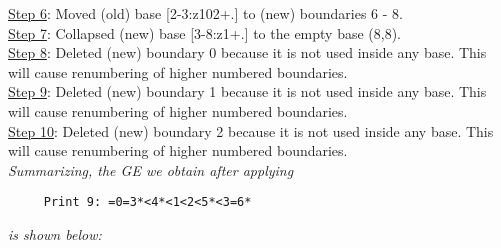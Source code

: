 \documentclass[final]{article}
\begin{document}
{\underline{Step 6}:} Moved (old) base [2-3:z102+.]  to (new) boundaries 6 - 8.\\
{\underline{Step 7}:} Collapsed (new) base [3-8:z1+.]  to the empty base (8,8).
\\
{\underline{Step 8}:} Deleted (new) boundary 0 because it is not used inside any base.  This will cause renumbering of higher numbered boundaries.
\\
{\underline{Step 9}:} Deleted (new) boundary 1 because it is not used inside any base.  This will cause renumbering of higher numbered boundaries.
\\
{\underline{Step 10}:} Deleted (new) boundary 2 because it is not used inside any base.  This will cause renumbering of higher numbered boundaries.
\\[0.1in]
{\em Summarizing, the GE we obtain after applying}
\begin{verbatim}
     Print 9: =0=3*<4*<1<2<5*<3=6*
\end{verbatim}
{\em is shown below:}
\end{document}
